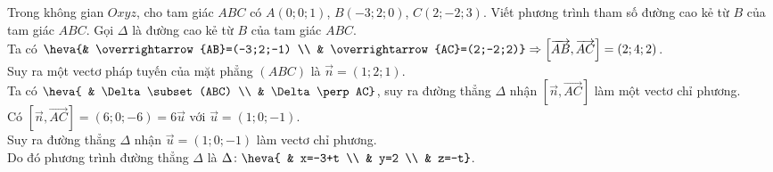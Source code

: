 \TL
\begin{ex}%
Trong không gian $Oxyz$, cho tam giác $ABC$ có $A(0;0;1)$, $B(-3;2;0)$, $C(2;-2;3)$. Viết phương trình tham số đường cao kẻ từ $B$ của tam giác $ABC$.
\loigiai
{
Gọi $\Delta$ là đường cao kẻ từ $B$ của tam giác $ABC$.\\
Ta có $\heva{& \overrightarrow{AB}=(-3;2;-1) \\ & \overrightarrow{AC}=(2;-2;2)} \Rightarrow \left[\overrightarrow{AB},\overrightarrow{AC}\right]=(2;4;2)$. \\
Suy ra một vectơ pháp tuyến của mặt phẳng $(ABC)$ là $\overrightarrow{n}=(1;2;1)$.\\
Ta có $\heva{ & \Delta \subset(ABC) \\ & \Delta \perp AC}$, suy ra đường thẳng $\Delta$ nhận $\left[\overrightarrow{n},\overrightarrow{AC}\right]$ làm một vectơ chỉ phương.\\
Có $\left[\overrightarrow{n},\overrightarrow{AC}\right]=(6;0;-6)=6\overrightarrow{u}$ với $\overrightarrow{u}=(1;0;-1)$. \\
Suy ra đường thẳng $\Delta$ nhận $\overrightarrow{u}=(1;0;-1)$ làm vectơ chỉ phương.\\
Do đó phương trình đường thẳng $\Delta$ là $\Delta \colon \heva{ & x=-3+t \\ & y=2 \\ & z=-t}$.
}
\end{ex}

